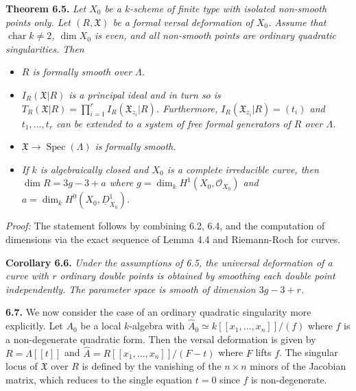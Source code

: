 \documentclass[11pt]{article}
\theoremstyle{plain}
\theoremstyle{definition}
\theoremstyle{remark}
\DeclareMathOperator{\Spec}{Spec}
\begin{document}
\medskip
\noindent\textbf{Theorem 6.5.} \textit{Let $X_0$ be a $k$-scheme of finite type with isolated non-smooth points only. Let $(R, \mathfrak{X})$ be a formal versal deformation of $X_0$. Assume that $\operatorname{char} k \neq 2$, $\dim X_0$ is even, and all non-smooth points are ordinary quadratic singularities. Then}
\begin{itemize}
\item[(1)] \textit{$R$ is formally smooth over $\Lambda$.}
\item[(2)] \textit{$I_R(\mathfrak{X}|R)$ is a principal ideal and in turn so is $T_R(\mathfrak{X}|R) = \prod_{i=1}^r I_R(\mathfrak{X}_{z_i}|R)$. Furthermore, $I_R(\mathfrak{X}_{z_i}|R) = (t_i)$ and $t_1, \ldots, t_r$ can be extended to a system of free formal generators of $R$ over $\Lambda$.}
\item[(3)] \textit{$\mathfrak{X} \to \Spec(\Lambda)$ is formally smooth.}
\item[(4)] \textit{If $k$ is algebraically closed and $X_0$ is a complete irreducible curve, then $\dim R = 3g - 3 + a$ where $g = \dim_k H^1(X_0, \mathcal{O}_{X_0})$ and $a = \dim_k H^0(X_0, \underline{D}_{X_0}^1)$.}
\end{itemize}

\medskip
\noindent\textit{Proof:} The statement follows by combining 6.2, 6.4, and the computation of dimensions via the exact sequence of Lemma 4.4 and Riemann-Roch for curves.

\medskip
\noindent\textbf{Corollary 6.6.} \textit{Under the assumptions of 6.5, the universal deformation of a curve with $r$ ordinary double points is obtained by smoothing each double point independently. The parameter space is smooth of dimension $3g - 3 + r$.}

\medskip
\noindent\textbf{6.7.} We now consider the case of an ordinary quadratic singularity more explicitly. Let $A_0$ be a local $k$-algebra with $\widehat{A}_0 \simeq k[[x_1, \ldots, x_n]]/(f)$ where $f$ is a non-degenerate quadratic form. Then the versal deformation is given by $R = \Lambda[[t]]$ and $\widehat{A} = R[[x_1, \ldots, x_n]]/(F - t)$ where $F$ lifts $f$. The singular locus of $\mathfrak{X}$ over $R$ is defined by the vanishing of the $n \times n$ minors of the Jacobian matrix, which reduces to the single equation $t = 0$ since $f$ is non-degenerate.
\end{document}
